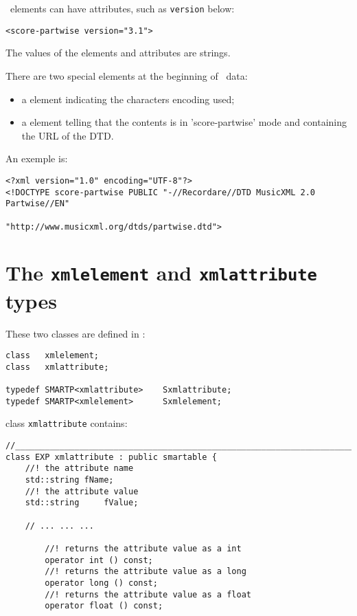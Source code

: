 \mxml\ elements can have attributes, such as {\tt version} below:
\begin{lstlisting}[language=MusicXML]
<score-partwise version="3.1">
\end{lstlisting}

The values of the elements and attributes are strings.

There are two special elements at the beginning of \mxml\ data:
\begin{itemize}
\item a  element indicating the characters encoding used;
\item a  element telling that the contents is in ’score-partwise’ mode and containing the URL of the DTD.
\end{itemize}

An exemple is:
\begin{lstlisting}[language=MusicXML]
<?xml version="1.0" encoding="UTF-8"?>
<!DOCTYPE score-partwise PUBLIC "-//Recordare//DTD MusicXML 2.0 Partwise//EN"
                                "http://www.musicxml.org/dtds/partwise.dtd">
\end{lstlisting}


\section{The {\tt xmlelement} and {\tt xmlattribute} types}

These two classes are defined in :
\begin{lstlisting}[language=CPlusPlus]
class   xmlelement;
class   xmlattribute;

typedef SMARTP<xmlattribute> 	Sxmlattribute;
typedef SMARTP<xmlelement> 		Sxmlelement;
\end{lstlisting}

class   {\tt xmlattribute} contains:
\begin{lstlisting}[language=CPlusPlus]
//______________________________________________________________________________
class EXP xmlattribute : public smartable {
	//! the attribute name
	std::string	fName;
	//! the attribute value
	std::string 	fValue;

	// ... ... ...

		//! returns the attribute value as a int
		operator int () const;
		//! returns the attribute value as a long
		operator long () const;
		//! returns the attribute value as a float
		operator float () const;
\end{lstlisting}

